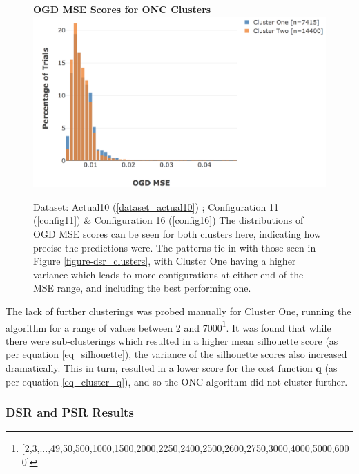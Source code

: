 \documentclass[a4paper,11pt,oneside]{article}
\theoremstyle{plain}
\theoremstyle{definition}
\begin{document}
	\begin{figure}[H]
		\centering
		\textbf{OGD MSE Scores for ONC Clusters}
		\includegraphics[scale=0.45]{images/results/8_10_dsr/cluster_distributions_mse.png} 
		\caption[OGD MSE Scores for ONC Clusters]{Dataset: Actual10 (\ref{dataset_actual10}) ; Configuration 11 (\ref{config11}) \&  Configuration 16 (\ref{config16})
			\newline The distributions of OGD MSE scores can be seen for both clusters here, indicating how precise the predictions were. The patterns tie in with those seen in Figure \ref{figure-dsr_clusters}, with Cluster One having a higher variance which leads to more configurations at either end of the MSE range, and including the best performing one.}
		\label{figure-dsr_clusters_mse}
	\end{figure}
	
	The lack of further clusterings was probed manually for Cluster One, running the algorithm for a range of values between 2 and 7000\footnote{[2,3,...,49,50,500,1000,1500,2000,2250,2400,2500,2600,2750,3000,4000,5000,6000]}. It was found that while there were sub-clusterings which resulted in a higher mean silhouette score (as per equation \eqref{eq_silhouette}), the variance of the silhouette scores also increased dramatically. This in turn, resulted in a lower score for the cost function $\mathbf{q}$ (as per equation \eqref{eq_cluster_q}), and so the ONC algorithm did not cluster further.
	
	\subsubsection{DSR and PSR Results}\label{results_dsr2}
	
\end{document}
